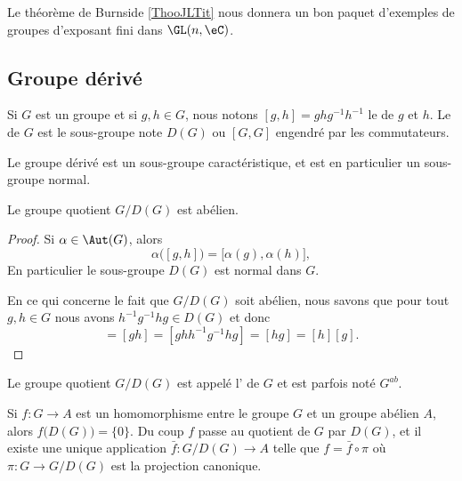 Le théorème de Burnside \ref{ThooJLTit} nous donnera un bon paquet d'exemples de groupes d'exposant fini dans \( \GL(n,\eC)\).

\subsection{Groupe dérivé}

Si \( G\) est un groupe et si \( g,h\in G\), nous notons \( [g,h]=ghg^{-1}h^{-1}\) le  de \( g\) et \( h\). Le  de \( G\) est le sous-groupe note \( D(G)\) ou \( [G,G]\) engendré par les commutateurs.

\begin{proposition}
    Le groupe dérivé est un sous-groupe caractéristique, et est en particulier un sous-groupe normal.

    Le groupe quotient \( G/D(G)\) est abélien.
\end{proposition}

\begin{proof}
    Si \( \alpha\in \Aut(G)\), alors
    \begin{equation}
        \alpha\big( [g,h] \big)=\big[ \alpha(g),\alpha(h) \big],
    \end{equation}
    En particulier le sous-groupe \( D(G)\) est normal dans \( G\).

    En ce qui concerne le fait que \( G/D(G)\) soit abélien, nous savons que pour tout \( g,h\in G\) nous avons \( h^{-1}g^{-1}hg\in D(G)\) et donc
    \begin{equation}
        [g][h]=[gh]=[ghh^{-1}g^{-1}hg]=[hg]=[h][g].
    \end{equation}
\end{proof}

Le groupe quotient \( G/D(G)\) est appelé l' de \( G\) et est parfois noté \( G^{ab}\).


Si \( f\colon G\to A\) est un homomorphisme entre le groupe \( G\) et un groupe abélien \( A\), alors \( f\big( D(G) \big)=\{ 0 \}\). Du coup \( f\) passe au quotient de \( G\) par \( D(G)\), et il existe une unique application \( \bar f\colon G/D(G)\to A\) telle que \( f=\bar f\circ \pi\) où \( \pi\colon G\to G/D(G)\) est la projection canonique.

